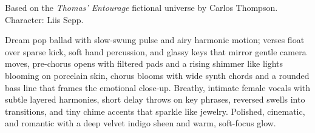 

\begin{notes}
Based on the \emph{Thomas’ Entourage} fictional universe by Carlos Thompson.\\
Character: Liis Sepp.\\
\end{notes}

\begin{style}
Dream pop ballad with slow-swung pulse and airy harmonic motion; verses float over sparse kick, soft hand percussion, and glassy keys that mirror gentle camera moves, pre-chorus opens with filtered pads and a rising shimmer like lights blooming on porcelain skin, chorus blooms with wide synth chords and a rounded bass line that frames the emotional close‑up. %
Breathy, intimate female vocals with subtle layered harmonies, short delay throws on key phrases, reversed swells into transitions, and tiny chime accents that sparkle like jewelry. %
Polished, cinematic, and romantic with a deep velvet indigo sheen and warm, soft-focus glow.
\end{style}

